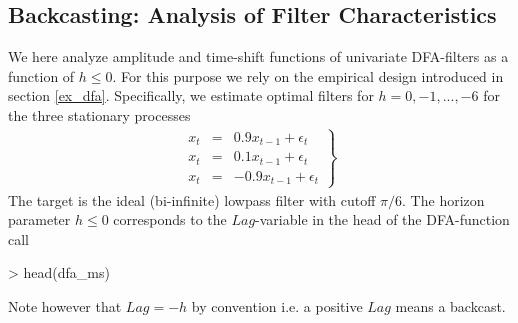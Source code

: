 \documentclass[a4paper]{book}
\begin{document}
\subsection{Backcasting: Analysis of Filter Characteristics}\label{back_fil}

We here analyze amplitude and time-shift functions of univariate DFA-filters as a function of $h\leq 0$. For this purpose we rely on the empirical design introduced in section \ref{ex_dfa}. Specifically, we estimate optimal filters for $h=0,-1,...,-6$ for the three stationary processes
\begin{eqnarray}
\left.\begin{array}{ccc}x_t&=&0.9x_{t-1}+\epsilon_t\\
x_t&=&0.1x_{t-1}+\epsilon_t\\
x_t&=&-0.9x_{t-1}+\epsilon_t
\end{array}\right\}\label{ar1_processes}
\end{eqnarray}
The target is the ideal (bi-infinite) lowpass filter with cutoff $\pi/6$. The horizon parameter $h\leq 0$ corresponds to the $Lag$-variable in the head of the DFA-function call
\begin{Schunk}
\begin{Sinput}
> head(dfa_ms)
\end{Sinput}
\begin{Soutput}
1 function (L, periodogram, Lag, Gamma)                            
2 {                                                                
3     K <- length(periodogram) - 1                                 
4     X <- exp(-(0+1i) * Lag * pi * (0:(K))/(K)) * rep(1, K + 1) * 
5         sqrt(periodogram)                                        
6     X_y <- exp(-(0+1i) * Lag * pi * (0:(K))/(K)) * rep(1, K +    
\end{Soutput}
\end{Schunk}
Note however that $Lag=-h$ by convention i.e. a positive $Lag$ means a backcast. 
\end{document}
